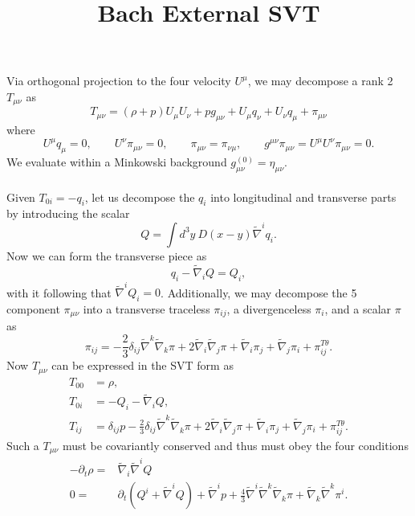\documentclass[10pt,letterpaper]{article}
\title{Bach External SVT}
\date{}
\begin{document}
\maketitle
\noindent 
Via orthogonal projection to the four velocity $U^\mu$, we may decompose a rank 2 $T_{\mu\nu}$ as
\begin{equation}
T_{\mu\nu} = (\rho+p)U_\mu U_\nu + p g_{\mu\nu} + U_\mu q_\nu + U_\nu q_\mu + \pi_{\mu\nu}
\end{equation}
where
\begin{equation}
	U^\mu q_{\mu} = 0,\qquad U^\nu \pi_{\mu\nu} = 0,\qquad \pi_{\mu\nu} = \pi_{\nu\mu},\qquad g^{\mu\nu}\pi_{\mu\nu} =U^\mu U^\nu \pi_{\mu\nu} = 0.
\end{equation}
We evaluate within a Minkowski background $g^{(0)}_{\mu\nu} = \eta_{\mu\nu}$. 
 \\ \\
Given $ T_{0i} = -q_i$, let us decompose the $q_i$ into longitudinal and transverse parts by introducing the scalar
\begin{equation}
Q = \int d^3y\ D(x-y)\tilde\nabla^i q_i.
\end{equation}
Now we can form the transverse piece as
\begin{equation}
q_i -  \tilde\nabla_i Q = Q_i,
\end{equation}
with it following that $\tilde\nabla^i Q_i = 0$. Additionally, we may decompose the 5 component $\pi_{\mu\nu}$ into a transverse traceless $\pi_{ij}$, a divergenceless $\pi_i$, and a scalar $\pi$ as
\begin{equation}
	\pi_{ij} = -\frac{2}{3} \delta_{ij}\tilde\nabla^k \tilde\nabla_k \pi  + 2\tilde\nabla_i\tilde\nabla_j \pi + \tilde\nabla_i \pi_j + \tilde\nabla_j \pi_i + \pi_{ij}^{T\theta}.
\end{equation}
Now $ T_{\mu\nu}$ can be expressed in the SVT form as
\begin{align}
 T_{00}  &= \rho,
\nonumber\\	
 T_{0i} &= -Q_i - \tilde\nabla_i Q,
\nonumber\\	
 T_{ij}  &= \delta_{ij}  p -\frac{2}{3} \delta_{ij}\tilde\nabla^k \tilde\nabla_k \pi + 2\tilde\nabla_i\tilde\nabla_j \pi + \tilde\nabla_i \pi_j + \tilde\nabla_j \pi_i + \pi_{ij}^{T\theta}.
\end{align} 
Such a $ T_{\mu\nu}$ must be covariantly conserved and thus must obey the four conditions
\begin{align}
-\partial_t\rho = &{} \tilde\nabla_i \tilde\nabla^i Q\\
0 = &{} \partial_t (Q^i + \tilde\nabla^i Q) + \tilde\nabla^i  p +\frac43 \tilde\nabla^i \tilde\nabla^k \tilde\nabla_k \pi + \tilde\nabla_k \tilde\nabla^k \pi^i.
\end{align}
\end{document}
